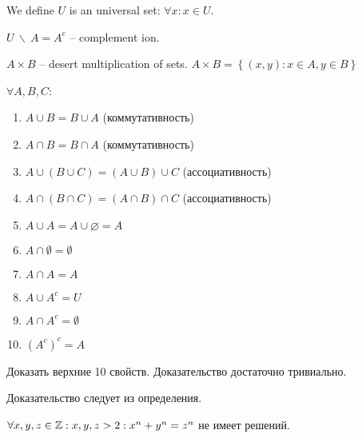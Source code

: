 We define $U$ is an universal set: $\forall x: x \in U$. 

$U \ \backslash \ A = A^{c} $ -- complement ion.

$A \times B$ -- desert multiplication of sets. $A \times B = \left\{ (x, y): x \in A, y \in B \right\} $

\begin{lemma}
	$\forall A, B, C$:
	 \begin{enumerate}
		\item $A \cup B = B \cup A$ (коммутативность)
		\item $A \cap B = B \cap A$ (коммутативность)
		\item $A \cup (B \cup C) = (A \cup B) \cup C$ (ассоциативность)
		\item $A \cap (B \cap C) = (A \cap B) \cap C$ (ассоциативность)
		\item $A \cup A = A \cup \varnothing = A$
		\item $A \cap \emptyset = \emptyset$
		\item $A \cap A = A$
		\item $A \cup A^{c} = U$
		\item $A \cap A^{c} = \emptyset$
		\item $(A^{c})^{c} = A$
	\end{enumerate}
\end{lemma}

\begin{exercise}
	Доказать верхние 10 свойств. Доказательство достаточно тривиально.
\end{exercise}
\begin{note}
	Доказательство следует из определения.
\end{note}

\begin{theorem}
	$\forall x,y,z \in \mathbb{Z}: x,y,z > 2: x^{n} + y^{n} = z^{n}$ не имеет решений.	
\end{theorem}
